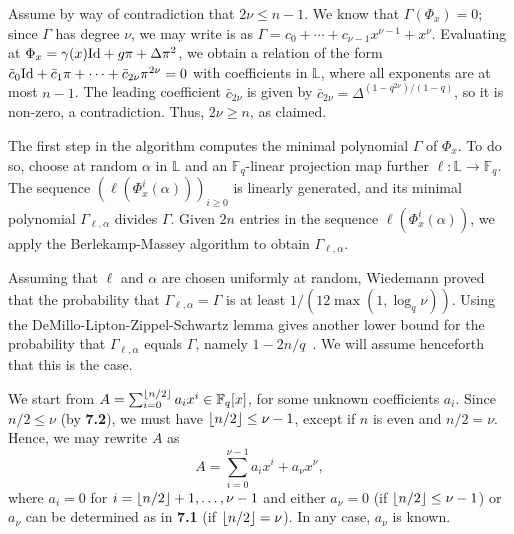 \documentclass[sigconf]{acmart}
\newcommand{\F}{\mathbb{F}}
\renewcommand{\L}{\mathbb{L}}
\DeclarePairedDelimiter\floor{\lfloor}{\rfloor}
\begin{document}
Assume by way of contradiction that $2\nu \le n-1$.  We know that
$\Gamma(\Phi_x) = 0$; since $\Gamma$ has degree $\nu$, we may write
is as $\Gamma = c_0 + \cdots + c_{\nu-1} x^{\nu-1} +
x^\nu$. Evaluating at $\Phi_x = \gamma(x) {\rm Id} + g \pi + \Delta
\pi^2$, we obtain a relation of the form $\bar c_0 {\rm Id} + \bar
c_1 \pi + \cdots + \bar c_{2\nu} \pi^{2\nu} = 0$ with
coefficients in $\L$, where all exponents are at most $n-1$. The
leading coefficient $\bar c_{2\nu}$ is given by $\bar c_{2\nu} =
\Delta^{(1-q^{2\nu})/(1-q)}$, so it is non-zero, a contradiction.
Thus, $2\nu \ge n$, as claimed.

\smallskip{} The first step in the algorithm computes
the minimal polynomial $\Gamma$ of $\Phi_x$. 
To do so, choose at random $\alpha$ in $\L$ and an $\F_q$-linear
projection map further $\ell: \L \to \F_q$. The sequence
$(\ell(\Phi_x^i(\alpha)))_{i \ge 0}$ is linearly generated, and its
minimal polynomial $\Gamma_{\ell,\alpha}$ divides $\Gamma$. Given $2n$
entries in the sequence $\ell(\Phi_x^i(\alpha))$, we apply the
Berlekamp-Massey algorithm to obtain $\Gamma_{\ell,\alpha}$.

Assuming that $\ell$ and $\alpha$ are chosen uniformly at random,
Wiedemann proved~\cite{Wiedemann:1986:SSL:13738.13744} that the
probability that $\Gamma_{\ell,\alpha}=\Gamma$ is at least $1/(12
\max(1, \log_q \nu))$. Using the DeMillo-Lipton-Zippel-Schwartz lemma
gives another lower bound for the probability that
$\Gamma_{\ell,\alpha}$ equals $\Gamma$, namely
$1-2n/q$~\cite{Kaltofen:1991:PEP:113379.113396,Kaltofen-saun:1991:WMS:646027.676885}. We
will assume henceforth that this is the case.

\smallskip{}
We start from $A = \sum_{i = 0}^{\floor*{n/2}}a_ix^i \in \F_q[x]$, for
some unknown coefficients $a_i$. Since $n/2 \le \nu$ (by {\bf 7.2}), we must have 
$\floor*{n/2} \le \nu -1$, except if $n$ is even and $n/2 = \nu$.
Hence, we may rewrite $A$ as 
$$A = \sum_{i = 0}^{\nu - 1}a_ix^i + a_{\nu}x^{\nu},$$ where $a_i = 0$
for $i=\floor*{n/2}+1,\dots,\nu-1$ and either $a_\nu=0$ (if
$\floor*{n/2} \le \nu -1$) or $a_\nu$ can be determined as in {\bf
  7.1} (if $\floor*{n/2} = \nu$). In any case, $a_\nu$ is known.
\end{document}
